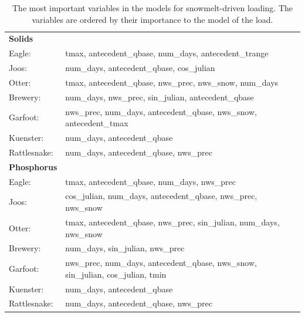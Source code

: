 \documentclass[12pt]{article}
\begin{document}
\begin{table}[h!]\small
    \begin{center}
    \begin{tabular}{ll}
        \textbf{Solids} & \\
        \hspace{5mm} Eagle: & tmax, antecedent\_qbase, num\_days, antecedent\_trange\\
        \hspace{5mm} Joos: & num\_days, antecedent\_qbase, cos\_julian\\
        \hspace{5mm} Otter: & tmax, antecedent\_qbase, nws\_prec, nws\_snow, num\_days\\
        \hspace{5mm} Brewery: & num\_days, nws\_prec, sin\_julian, antecedent\_qbase\\
        \hspace{5mm} Garfoot: & nws\_prec, num\_days, antecedent\_qbase, nws\_snow, antecedent\_tmax\\
        \hspace{5mm} Kuenster: & num\_days, antecedent\_qbase\\
        \hspace{5mm} Rattlesnake: & num\_days, antecedent\_qbase, nws\_prec
    \vspace{2mm}\\
        \textbf{Phosphorus} & \\
        \hspace{5mm} Eagle: & tmax, antecedent\_qbase, num\_days, nws\_prec\\
        \hspace{5mm} Joos: & cos\_julian, num\_days, antecedent\_qbase, nws\_prec, nws\_snow\\
        \hspace{5mm} Otter: & tmax, antecedent\_qbase, nws\_prec, sin\_julian, num\_days, nws\_snow\\
        \hspace{5mm} Brewery: & num\_days, sin\_julian, nws\_prec\\
        \hspace{5mm} Garfoot: & nws\_prec, num\_days, antecedent\_qbase, nws\_snow, sin\_julian, cos\_julian, tmin\\
        \hspace{5mm} Kuenster: & num\_days, antecedent\_qbase\\
        \hspace{5mm} Rattlesnake: & num\_days, antecedent\_qbase, nws\_prec\\
    \end{tabular}
    \caption{The most important variables in the models for snowmelt-driven loading. The variables are ordered by their importance to the model of the load. \label{snow_predictor_list}}
    \end{center}
\end{table}
\end{document}
